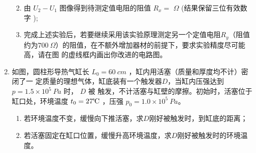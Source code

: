 \begin{enumerate}
\begin{enumerate}
\begin{figure}[h!]
\end{figure}



\item 
由 $U_{2}-U_{1}$ 图像得到待测定值电阻的阻值 $R_{x}= $ \underlinegap $ \Omega$ (结果保留三位有效数字 );


\item 
完成上述实验后，若要继续采用该实验原理测定另一个定值电阻$ R_{y} $（阻值约为$ 700 \ \Omega $）的阻值，在不额外增加器材的前提下，要求实验精度尽可能高，请在图  的虚线框内画出你改进的电路图。







\end{enumerate}





\newpage

\gaokaojs


\item 
如图，圆柱形导热气缸长 $L_{0}=60 \ cm$ ，缸内用活塞（质量和厚度均不计）密闭了一
定质量的理想气体，缸底装有一个触发器$  D $，当缸内压强达到 $p=1.5 \times 10^{5} \ Pa$ 时， $D$ 被
触发，不计活塞与缸壁的摩擦。初始时，活塞位于缸口处，环境温度 $t_{0}=27 \celsius $ ，压强
$p_{0}=1.0 \times 10^{5} \ Pa$。
\begin{enumerate}
	\item
	若环境温度不变，缓慢向下推活塞，求$ D $刚好被触发时，到缸底的距离； 
	\item 
	若活塞固定在缸口位置，缓慢升高环境温度，求$ D $刚好被触发时的环境温度。
	

\end{enumerate}
\end{enumerate}
